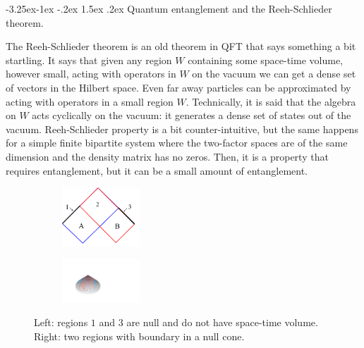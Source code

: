 \documentclass[11pt,a4paper]{article}
\makeatletter
\renewcommand\subsection{\@startsection{subsection}{2}{\z@}%
                                   {-3.25ex\@plus -1ex \@minus -.2ex}%
                                     {1.5ex \@plus .2ex}%
                                     {\normalfont\bfseries}}
\numberwithin{equation}{section}
\makeatother
\begin{document}
\subsection{Quantum entanglement and the Reeh-Schlieder theorem.}

The Reeh-Schlieder theorem is an old theorem in QFT that says something a bit startling. It says that given any region $W$ containing some space-time volume, however small, acting with operators in $W$ on the vacuum we can get a dense set of vectors in the Hilbert space. Even far away particles can be approximated by acting with operators in a small region $W$. Technically, it is said that the algebra on $W$ acts cyclically on the vacuum: it generates a dense set of states out of the vacuum. Reeh-Schlieder property is a bit counter-intuitive, but the same happens for a simple finite bipartite system where the two-factor spaces are of the same dimension and the density matrix has no zeros. Then, it is a property that requires entanglement, but it can be a small amount of entanglement.   

\begin{figure}[t]  
\begin{subfigure}
\centering
\hspace{1.3cm}\includegraphics[width=0.32\textwidth]{segmento.png}
\end{subfigure}
\hspace{2cm}
\begin{subfigure}
\centering
\includegraphics[width=0.32\textwidth]{enelcono.pdf}
\end{subfigure}
\captionsetup{width=0.9\textwidth}
\caption{Left: regions $1$ and $3$ are null and do not have space-time volume. Right: two regions with boundary in a null cone. }
\label{cono1}
\end{figure}  
\end{document}
